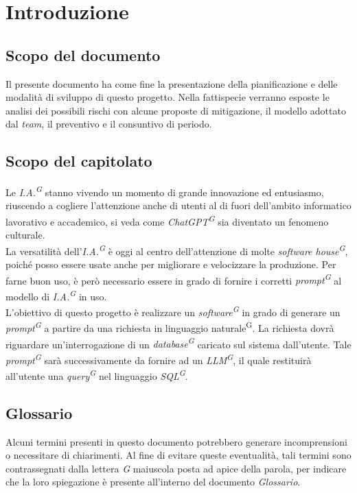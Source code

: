 \documentclass[5pt]{article}
\begin{document}
\pagebreak

\section{Introduzione}
  \subsection{Scopo del documento}
    Il presente documento ha come fine la presentazione della pianificazione e delle modalità di sviluppo di questo progetto. 
    Nella fattispecie verranno esposte le analisi dei possibili rischi con alcune proposte di mitigazione, il modello adottato dal \textit{team}, 
    il preventivo e il consuntivo di periodo.

  \subsection{Scopo del capitolato}
    Le \textit{I.A.\textsuperscript{G}} stanno vivendo un momento di grande innovazione ed entusiasmo, 
    riuscendo a cogliere l'attenzione anche di utenti al di fuori dell'ambito informatico lavorativo e accademico, 
    si veda come \textit{ChatGPT\textsuperscript{G}} sia diventato un fenomeno culturale. \\
    La versatilità dell'\textit{I.A.\textsuperscript{G}} è oggi al centro dell'attenzione di molte \textit{software house\textsuperscript{G}}, 
    poiché posso essere usate anche per migliorare e velocizzare la produzione. 
    Per farne buon uso, è però necessario essere in grado di fornire i corretti \textit{prompt\textsuperscript{G}} al 
    modello di \textit{I.A.\textsuperscript{G}} in uso. \\


    L'obiettivo di questo progetto è realizzare un \textit{software\textsuperscript{G}} in grado di generare 
    un \textit{prompt\textsuperscript{G}} a partire da una richiesta in linguaggio naturale\textsuperscript{G}. La richiesta dovrà riguardare un'interrogazione 
    di un \textit{database\textsuperscript{G}} caricato sul sistema dall'utente. Tale \textit{prompt\textsuperscript{G}} sarà successivamente da fornire 
    ad un \textit{LLM\textsuperscript{G}}, il quale restituirà all'utente una \textit{query\textsuperscript{G}} nel linguaggio 
    \textit{SQL\textsuperscript{G}}.

  \subsection{Glossario}
    Alcuni termini presenti in questo documento potrebbero generare incomprensioni o necessitare di chiarimenti. 
    Al fine di evitare queste eventualità, tali termini sono contrassegnati dalla lettera \textit{G} maiuscola posta ad apice della parola, 
    per indicare che la loro spiegazione è presente all'interno del documento \textit{Glossario}.
\end{document}
